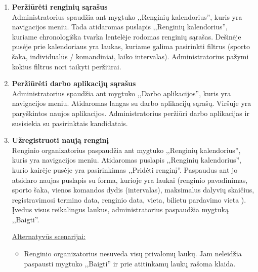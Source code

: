 \documentclass{VUMIFPSkursinis}
\begin{document}
\begin{enumerate} [label = \textbf{U\arabic*.}]
					\underline{Alternatyvūs scenarijai:}
					\begin{itemize}
						\item Administratorius bando atlikti vieną iš šių veiksmų kito administratoriaus paskyrai. Tokiu atveju mygtukai yra neaktyvūs ir virš jų atsiranda užrašas, kad administratoriai negali redaguoti kitų administratorių prieigos.
						\item Administratorius bando apriboti arba blokuoti savo paskyrą. Tokių atveju iššoka langas, kuriame parnešame, kad administratorius gali savo paskyra tik ištrinti.
					\end{itemize}
				
			\item \textbf{Peržiūrėti renginių sąrašus}   \\
					Administratorius spaudžia ant mygtuko ,,Renginių kalendorius'', kuris yra navigacijos meniu. Tada atidaromas puslapis ,,Renginių kalendorius'', kuriame chronologiška tvarka lentelėje rodomas renginių sąrašas. Dešinėje pusėje prie kalendoriaus yra laukas, kuriame galima pasirinkti filtrus (sporto šaka, individualūs / komandiniai, laiko intervalas). Administratorius pažymi kokius filtrus nori taikyti peržiūrai.
				
			\item \textbf{Peržiūrėti darbo aplikacijų sąrašus}   \\
					Administratorius spaudžia ant mygtuko ,,Darbo aplikacijos'', kuris yra navigacijos meniu. Atidaromas langas su darbo aplikacijų sąrašų. Viršuje yra paryškintos naujos aplikacijos. Administratorius peržiūri darbo aplikacijas ir susisiekia su pasirinktais kandidatais.

			\item \textbf{Užregistruoti naują renginį}   \\
					Renginio organizatorius paspaudžia ant mygtuko ,,Renginių kalendorius'', kuris yra navigacijos meniu. Atidaromas puslapis ,,Renginių kalendorius'', kurio kairėje pusėje yra pasirinkimas ,,Pridėti renginį''. Paspaudus ant jo atsidaro naujas puslapis su forma, kurioje yra laukai (renginio pavadinimas, sporto šaka, vienos komandos dydis (intervalas), maksimalus dalyvių skaičius, registravimosi termino data, renginio data, vieta, bilietu pardavimo vieta ). Įvedus visus reikalingus laukus, administratorius paspaudžia mygtuką ,,Baigti''.
					
					\underline{Alternatyvūs scenarijai:}
					\begin{itemize}
						\item Renginio organizatorius nesuveda visų privalomų laukų. Jam neleidžia paspausti mygtuko ,,Baigti'' ir prie atitinkamų laukų rašoma klaida.
					\end{itemize}	
			

\end{enumerate}
\end{document}
